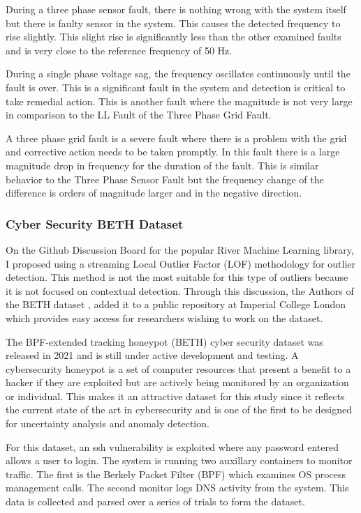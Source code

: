 During a three phase sensor fault, there is nothing wrong with the system itself but there is faulty sensor in the system. This causes the detected frequency to rise slightly. This slight rise is significantly less than the other examined faults and is very close to the reference frequency of 50 Hz.

During a single phase voltage sag, the frequency oscillates continuously until the fault is over. This is a significant fault in the system and detection is critical to take remedial action. This is another fault where the magnitude is not very large in comparison to the LL Fault of the Three Phase Grid Fault.

A three phase grid fault is a severe fault where there is a problem with the grid and corrective action needs to be taken promptly. In this fault there is a large magnitude drop in frequency for the duration of the fault. This is similar behavior to the Three Phase Sensor Fault but the frequency change of the difference is orders of magnitude larger and in the negative direction.

\subsubsection{Cyber Security BETH Dataset}
\label{ref_beth_dataset}

On the Github Discussion Board \parencite{RiverGithub2022} for the popular River \parencite{2020river} Machine Learning library, I proposed using a streaming Local Outlier Factor (LOF) methodology for outlier detection. This method is not the most suitable for this type of outliers because it is not focused on contextual detection. Through this discussion, the Authors of the BETH dataset \parencite{beth-dataset}, added it to a public repository at Imperial College London which provides easy access for researchers wishing to work on the dataset.

The BPF-extended tracking honeypot (BETH) cyber security dataset \parencite{beth-dataset} was released in 2021 and is still under active development and testing. A cybersecurity honeypot is a set of computer resources that present a benefit to a hacker if they are exploited but are actively being monitored by an organization or individual. This makes it an attractive dataset for this study since it reflects the current state of the art in cybersecurity and is one of the first to be designed for uncertainty analysis and anomaly detection.

For this dataset, an ssh vulnerability is exploited where any password entered allows a user to login. The system is running two auxillary containers to monitor traffic. The first is the Berkely Packet Filter (BPF) which examines OS process management calls. The second monitor logs DNS activity from the system. This data is collected and parsed over a series of trials to form the dataset.

